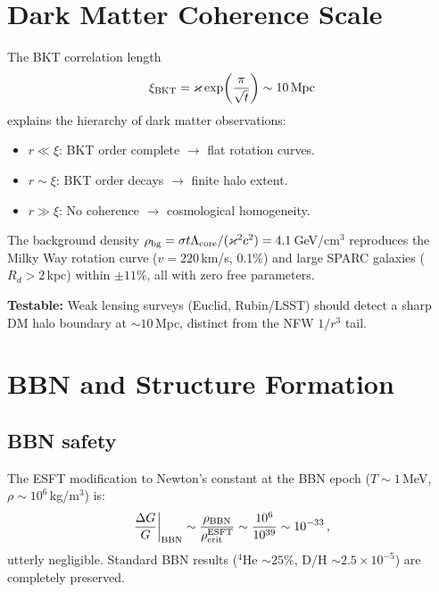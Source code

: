 \documentclass[twocolumn,preprintnumbers,amsmath,amssymb,prd]{revtex4-2}
\begin{document}
\section{Dark Matter Coherence Scale}
\label{sec:dm}

The BKT correlation length
\begin{equation}
\xi_{\rm BKT} = \varkappa\exp\!\left(\frac{\pi}{\sqrt{t}}\right) \sim 10\,\text{Mpc}
\end{equation}
explains the hierarchy of dark matter observations:
\begin{itemize}
\item $r \ll \xi$: BKT order complete $\to$ flat rotation curves.
\item $r \sim \xi$: BKT order decays $\to$ finite halo extent.
\item $r \gg \xi$: No coherence $\to$ cosmological homogeneity.
\end{itemize}

The background density $\rho_{\rm bg} = \sigma t\Lambda_{\rm core}/(\varkappa^2 c^2) = 4.1\,$GeV/cm$^3$ reproduces the Milky Way rotation curve ($v = 220\,$km/s, 0.1\%) and large SPARC galaxies ($R_d > 2\,$kpc) within $\pm 11\%$, all with zero free parameters.

\textbf{Testable:} Weak lensing surveys (Euclid, Rubin/LSST) should detect a sharp DM halo boundary at $\sim 10\,$Mpc, distinct from the NFW $1/r^3$ tail.

\section{BBN and Structure Formation}
\label{sec:bbn}

\subsection{BBN safety}

The ESFT modification to Newton's constant at the BBN epoch ($T \sim 1\,$MeV, $\rho \sim 10^6\,$kg/m$^3$) is:
\begin{equation}
\frac{\Delta G}{G}\bigg|_{\rm BBN} \sim \frac{\rho_{\rm BBN}}{\rho_{\rm crit}^{\rm ESFT}} \sim \frac{10^6}{10^{39}} \sim 10^{-33}\,,
\end{equation}
utterly negligible.
Standard BBN results (${}^4$He $\sim 25\%$, D/H $\sim 2.5\times10^{-5}$) are completely preserved.
\end{document}
